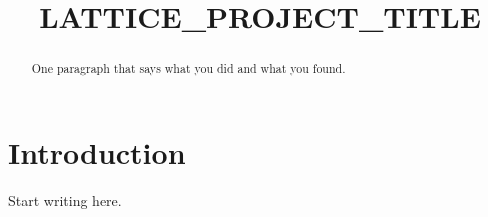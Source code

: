 \documentclass[conference]{IEEEtran}
\begin{document}
\title{LATTICE_PROJECT_TITLE}
\author{}
\maketitle

\begin{abstract}
One paragraph that says what you did and what you found.
\end{abstract}

\section{Introduction}
Start writing here.

\nocite{knuth1984} %


\end{document}
